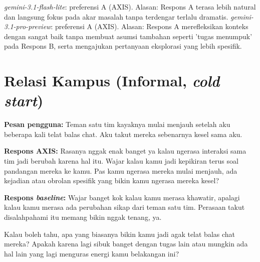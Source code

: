 \textit{gemini-3.1-flash-lite}: preferensi A (AXIS). Alasan: Respons A terasa lebih natural dan langsung fokus pada akar masalah tanpa terdengar terlalu dramatis.\newline
\textit{gemini-3.1-pro-preview}: preferensi A (AXIS). Alasan: Respons A merefleksikan konteks dengan sangat baik tanpa membuat asumsi tambahan seperti 'tugas menumpuk' pada Respons B, serta mengajukan pertanyaan eksplorasi yang lebih spesifik.\newline

\section{Relasi Kampus (Informal, \textit{cold start})}

\textbf{Pesan pengguna:} Teman satu tim kayaknya mulai menjauh setelah aku beberapa kali telat balas chat. Aku takut mereka sebenarnya kesel sama aku.

\textbf{Respons AXIS:} Rasanya nggak enak banget ya kalau ngerasa interaksi sama tim jadi berubah karena hal itu. Wajar kalau kamu jadi kepikiran terus soal pandangan mereka ke kamu. Pas kamu ngerasa mereka mulai menjauh, ada kejadian atau obrolan spesifik yang bikin kamu ngerasa mereka kesel?

\textbf{Respons \textit{baseline}:} Wajar banget kok kalau kamu merasa khawatir, apalagi kalau kamu merasa ada perubahan sikap dari teman satu tim. Perasaan takut disalahpahami itu memang bikin nggak tenang, ya.

Kalau boleh tahu, apa yang biasanya bikin kamu jadi agak telat balas chat mereka? Apakah karena lagi sibuk banget dengan tugas lain atau mungkin ada hal lain yang lagi menguras energi kamu belakangan ini?

